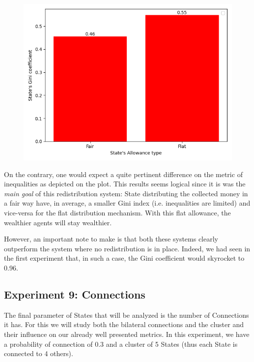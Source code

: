 {{{{{{{        \begin{figure}
            \includegraphics[width=\linewidth]{img/exp/8_3.png}
        \end{figure} 
        { On the contrary, one would expect a quite pertinent difference on the metric of inequalities as depicted on the plot. This results seems logical since it is was the \emph{main goal} of this redistribution system: State distributing the collected money in a fair way have, in average, a smaller Gini index (i.e. inequalities are limited) and vice-versa for the flat distribution mechanism. With this flat allowance, the wealthier agents will stay wealthier.

        However, an important note to make is that both these systems clearly outperform the system where no redistribution is in place. Indeed, we had seen in the first experiment that, in such a case, the Gini coefficient would skyrocket to $0.96$.
        \par



    \subsection{Experiment 9: Connections}
    The final parameter of States that will be analyzed is the number of Connections it has. For this we will study both the bilateral connections and the cluster and their influence on our already well presented metrics. In this experiment, we have a probability of connection of 0.3 and a cluster of 5 States (thus each State is connected to 4 others).

}}}}}}}}
